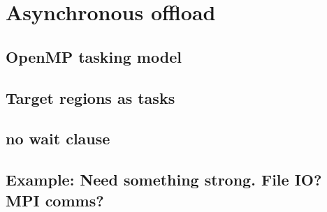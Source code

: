 

\chapter{Asynchronous offload}
\label{chapter:async}
\section{OpenMP tasking model}
\section{Target regions as tasks}
\section{no wait clause}
\section{Example: Need something strong. File IO? MPI comms?}
